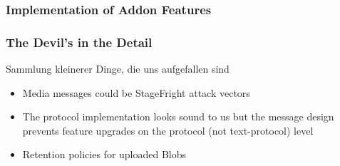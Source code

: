 \documentclass[
	aspectratio=169,
	xetex,
]{beamer}
\newcounter{i}
\begin{document}
\begin{frame}[t]
	\frametitle{Implementation of Addon Features}

		
\end{frame}



\begin{frame}
	\frametitle{The Devil's in the Detail}
	Sammlung kleinerer Dinge, die uns aufgefallen sind
	\begin{itemize}
		\item Media messages could be StageFright attack vectors
		\item The protocol implementation looks sound to us but the message design prevents feature upgrades on the protocol (not text-protocol) level
		\item Retention policies for uploaded Blobs

	\end{itemize}
\end{frame}
\end{document}

